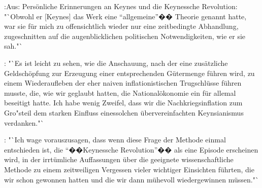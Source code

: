 \documentclass[
    onecolumn,
    a4paper,
    abstracton,
    parskip=half
    ,final
    ]{scrartcl}
\begin{document}
\citep[vgl.][S.91]{Hayek1969}:Aus: Pers{\"o}nliche Erinnerungen an Keynes und die Keynessche Revolution:  "`Obwohl er [Keynes] das Werk eine "`allgemeine"'�� Theorie genannt hatte, war sie f{\"u}r mich zu offensichtlich wieder nur eine zeitbedingte Abhandlung, zugeschnitten auf die augenblicklichen politischen Notwendigkeiten, wie er sie sah."`

\citep[vgl.][S.93]{Hayek1969}: "`Es ist leicht zu sehen, wie die Anschauung, nach der eine zus{\"a}tzliche Geldsch{\"o}pfung zur Erzeugung einer entsprechenden G{\"u}termenge f{\"u}hren wird, zu einem Wiederaufleben der eher naiven inflationistischen Trugschl{\"u}sse f{\"u}hren musste, die, wie wir geglaubt hatten, die National{\"o}konomie ein f{\"u}r allemal beseitigt hatte. Ich habe wenig Zweifel, dass wir die Nachkriegsinflation zum Gro{"s}teil dem starken Einfluss einessolchen {\"u}bervereinfachten Keynsianismus verdanken."`

\citep[vgl.][S.96]{Hayek1969}: "`Ich wage vorauszusagen, dass wenn diese Frage der Methode einmal entschieden ist, die "`��Keynessche Revolution"'�� als eine Episode erscheinen wird, in der irrt{\"u}mliche Auffassungen {\"u}ber die geeignete wissenschaftliche Methode zu einem zeitweiligen Vergessen vieler wichtiger Einsichten f{\"u}hrten, die wir schon gewonnen hatten und die wir dann m{\"u}hevoll wiedergewinnen m{\"u}ssen."`
\end{document}
